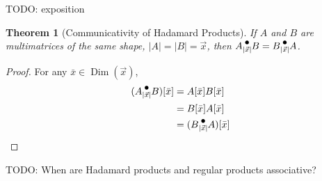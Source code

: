 \documentclass[12pt]{book}
\theoremstyle{plain}
\newtheorem{theorem}{Theorem}[chapter]
\theoremstyle{definition}
\theoremstyle{ppart}
\theoremstyle{case}
\theoremstyle{solution}
\DeclareMathOperator{\Dim}{Dim}
\newcommand{\dmult}[1]{\text{\raisebox{1ex}{$\underset{#1}{\,\bullet\,}$}}}
\newcommand{\shape}[1]{\left|#1\right|}
\begin{document}
TODO: exposition

\begin{theorem}[Communicativity of Hadamard Products]
If $A$ and $B$ are multimatrices of the same shape, $\shape{A} = \shape{B} = \vec{x}$,
then $A \dmult{\shape{\vec{x}}} B = B \dmult{\shape{\vec{x}}} A$.
\end{theorem}
\begin{proof}
For any $\bar{x} \in \Dim(\vec{x})$,
\begin{align*}
(A \dmult{\shape{\vec{x}}} B)[\bar{x}]
  &= A[\bar{x}] B[\bar{x}] \\
  &= B[\bar{x}] A[\bar{x}] \\
  &= (B \dmult{\shape{\vec{x}}} A)[\bar{x}]
\end{align*}
\end{proof}

TODO: When are Hadamard products and regular products associative?
\end{document}
